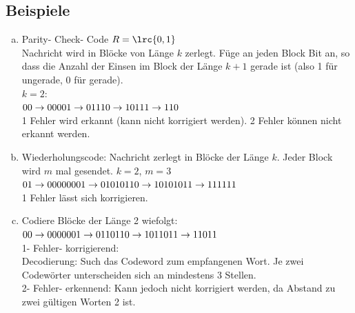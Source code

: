 	\subsection{Beispiele}
		\begin{enumerate}[a)]
			\item Parity- Check- Code
				$R=\lrc{0,1}$\\
				Nachricht wird in Blöcke von Länge $k$ zerlegt. Füge an jeden Block Bit an, so dass die Anzahl der Einsen im Block der Länge $k+1$ gerade ist (also 1 für ungerade, 0 für gerade).\\
				$k=2$:\\
				$00\rightarrow 000\\
				01\rightarrow 011\\
				10\rightarrow 101\\
				11\rightarrow 110$\\
				1 Fehler wird erkannt (kann nicht korrigiert werden). 2 Fehler können nicht erkannt werden.
			\item Wiederholungscode: Nachricht zerlegt in Blöcke der Länge $k$. Jeder Block wird $m$ mal gesendet. $k=2$, $m=3$\\
				$01\rightarrow 000000\\
				01\rightarrow 010101\\
				10\rightarrow101010\\
				11\rightarrow111111$\\
				1 Fehler lässt sich korrigieren.
			\item Codiere Blöcke der Länge 2 wiefolgt:\\
				$00\rightarrow 00000\\
				01\rightarrow 01101\\
				10\rightarrow 10110\\
				11\rightarrow 11011$\\
				1- Fehler- korrigierend:\\
				Decodierung: Such das  Codeword zum empfangenen Wort. Je zwei\\Codewörter unterscheiden sich an mindestens 3 Stellen.\\
				2- Fehler- erkennend: Kann jedoch nicht korrigiert werden, da Abstand zu\\
				zwei gültigen Worten 2 ist.
		\end{enumerate}

